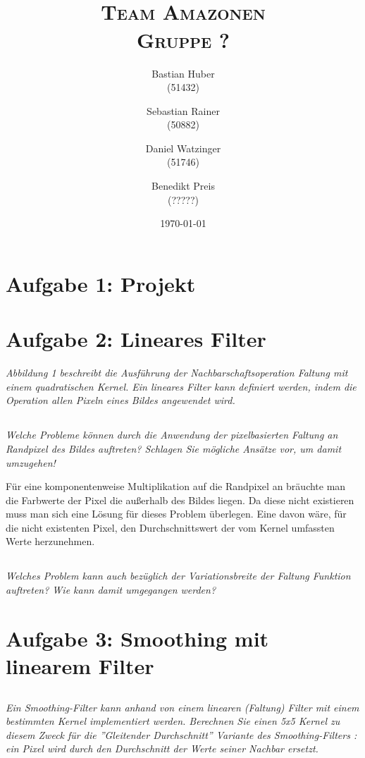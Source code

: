 \documentclass{article}
\author{Bastian Huber\\(51432) \and Sebastian Rainer\\(50882) \and Daniel Watzinger\\(51746) \and Benedikt Preis \\(?????)}
\title{\textbf{\huge{\thetitle}}\\\Large\textsc{Team Amazonen}\\\large\textsc{Gruppe ?}}
\date{\today}
\begin{document}
\hyphenation{}

\maketitle

\pagestyle{fancy}

\section{Aufgabe 1: Projekt}
\section{Aufgabe 2: Lineares Filter}
\textit{Abbildung 1 beschreibt die Ausführung der Nachbarschaftsoperation Faltung mit einem quadratischen Kernel. Ein lineares Filter kann definiert werden, indem die Operation allen Pixeln eines Bildes angewendet wird.}

\subsection{}
\textit{Welche Probleme können durch die Anwendung der pixelbasierten Faltung an Randpixel des Bildes auftreten? Schlagen Sie mögliche Ansätze vor, um damit umzugehen!}

Für eine komponentenweise Multiplikation auf die Randpixel an bräuchte 
man die Farbwerte der Pixel die außerhalb des Bildes liegen. Da diese 
nicht existieren muss man sich eine Lösung für dieses Problem überlegen.
Eine davon wäre, für die nicht existenten Pixel, den Durchschnittswert der
vom Kernel umfassten Werte herzunehmen.

\subsection{}
\textit{Welches Problem kann auch bezüglich der Variationsbreite der Faltung Funktion auftreten? Wie kann damit umgegangen werden?}

\section{Aufgabe 3: Smoothing mit linearem Filter}
	\subsection{}
	\textit{Ein Smoothing-Filter kann anhand von einem linearen (Faltung) Filter mit einem
bestimmten Kernel implementiert werden. Berechnen Sie einen 5x5 Kernel zu diesem Zweck
für die ”Gleitender Durchschnitt” Variante des Smoothing-Filters : ein Pixel wird durch
den Durchschnitt der Werte seiner Nachbar ersetzt.}
\end{document}
